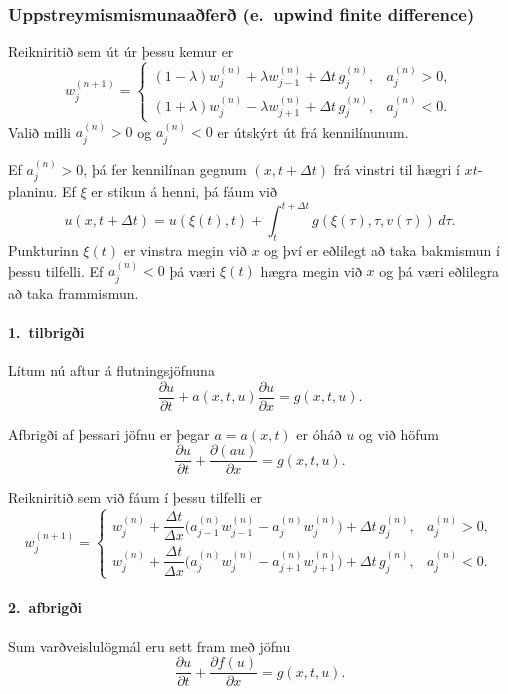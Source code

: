 \documentclass[icelandic,a4paper,12pt]{article}
\begin{document}
\subsubsection{Uppstreymismismunaaðferð (e.~upwind finite difference)} 
Reikniritið sem út úr þessu kemur er
$$
w_j^{(n+1)}=
\begin{cases} 
(1-\lambda) w_j^{(n)}+\lambda w_{j-1}^{(n)}+\Delta
t\, g_j^{(n)},&a_j^{(n)}>0,\\
(1+\lambda) w_j^{(n)}-\lambda w_{j+1}^{(n)}+\Delta
t\, g_j^{(n)},&a_j^{(n)}<0.
\end{cases}
$$
\smallskip
Valið milli $a_j^{(n)}>0$ og  $a_j^{(n)}<0$ er útskýrt út frá
kennilínunum.  

\smallskip
Ef $a_j^{(n)}>0$, þá fer kennilínan gegnum $(x,t+\Delta t)$ 
frá vinstri til hægri í $xt$-planinu.  Ef $\xi$ er stikun á henni, þá
fáum við
$$
u(x,t+\Delta t)=u(\xi(t),t)+\int_t^{t+\Delta t}
g(\xi(\tau),\tau,v(\tau))\, d\tau.
$$
Punkturinn $\xi(t)$ er vinstra megin við $x$ og því er eðlilegt að
taka bakmismun í þessu tilfelli.  Ef $a_j^{(n)}<0$ þá væri $\xi(t)$
hægra megin við $x$ og þá væri eðlilegra að taka frammismun. 



\paragraph{1.~tilbrigði} 
Lítum nú aftur á flutningsjöfnuna
$$
\dfrac{\partial u}{\partial t}
+a(x,t,u)\dfrac{\partial u}{\partial x}=g(x,t,u).
$$

Afbrigði af þessari jöfnu er þegar $a=a(x,t)$ 
er óháð $u$ og við höfum 
$$
\dfrac{\partial u}{\partial t}
+\dfrac{\partial (au)}{\partial x}=g(x,t,u).
$$

Reikniritið sem við fáum í þessu tilfelli er
$$
w_j^{(n+1)}=
\begin{cases} 
w_j^{(n)}+\dfrac{\Delta t}{\Delta x} 
\big(a_{j-1}^{(n)}w_{j-1}^{(n)}-a_j^{(n)}w_j^{(n)}\big)
+\Delta t\, g_j^{(n)},&a_j^{(n)}>0,\\
w_j^{(n)}+\dfrac{\Delta t}{\Delta x} 
\big(a_{j}^{(n)}w_{j}^{(n)}-a_{j+1}^{(n)}w_{j+1}^{(n)}\big)
+\Delta t\, g_j^{(n)}, &a_j^{(n)}<0.
\end{cases}
$$



\paragraph{2.~afbrigði } 
Sum varðveislulögmál eru sett fram með jöfnu
$$
\dfrac{\partial u}{\partial t}
+\dfrac{\partial f(u)}{\partial x}=g(x,t,u).
$$
\end{document}
